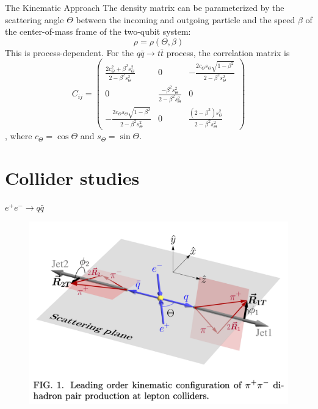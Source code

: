 \documentclass{beamer}
\begin{document}
    \begin{frame}{The Kinematic Approach}
        The density matrix can be parameterized by the scattering angle $\Theta$ between the incoming and outgoing particle and the speed $\beta$ of the center-of-mass frame of the two-qubit system: 
        \begin{equation*}
            \rho = \rho\left(\Theta, \beta\right)
        \end{equation*}
        This is process-dependent. For the $q\bar{q}\to t\bar{t}$ process, the correlation matrix is 
        \begin{equation*}
            C_{ij} = \left(
            \begin{array}{ccc}
                 \frac{2c^2_{\Theta}+\beta^2s^2_{\Theta}}{2-\beta^2s^2_{\Theta}} & 0 & -\frac{2c_{\Theta}s_{\Theta}\sqrt{1-\beta^2}}{2-\beta^2s^2_{\Theta}}  \\
                 0 & \frac{-\beta^2s^2_{\Theta}}{2-\beta^2s^2_{\Theta}} & 0 \\
                 -\frac{2c_{\Theta}s_{\Theta}\sqrt{1-\beta^2}}{2-\beta^2s^2_{\Theta}} & 0 & \frac{(2-\beta^2)s^2_{\Theta}}{2-\beta^2s^2_{\Theta}}
            \end{array}
            \right)
        \end{equation*}, 
        where $c_\Theta =\cos\Theta$ and $s_{\Theta} = \sin\Theta$.
        \begin{center}
            \footnotesize {}
        \end{center}
    \end{frame}

    \section{Collider studies}

    \begin{frame}{$e^+e^-\to q\bar{q}$ \footnotesize {}}       
        \begin{figure}[htbp]
            \centering
            \includegraphics[width=0.6\linewidth]{img/eeqq.png}
        \end{figure}
    \end{frame}
\end{document}
